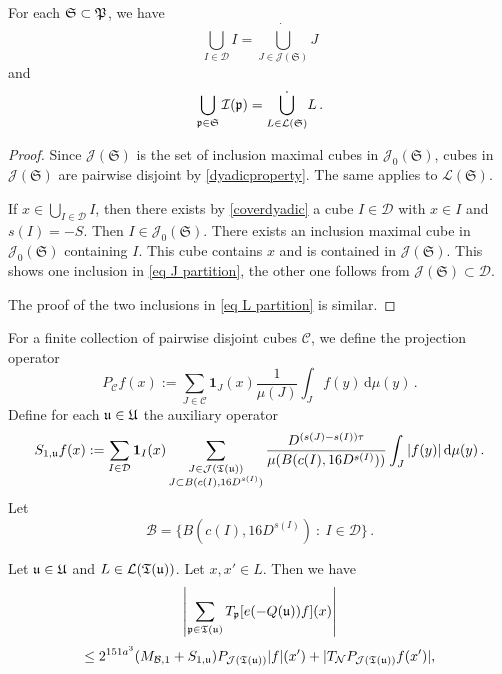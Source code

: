 \begin{lemma}
    \label{lem partition}
    For each $\mathfrak{S} \subset \mathfrak P$, we have
    \begin{equation}
        \label{eq J partition}
        \bigcup_{I \in \mathcal{D}} I = \dot{\bigcup_{J \in \mathcal{J}(\mathfrak{S})}} J
    \end{equation}
    and
    \begin{equation}
        \label{eq L partition}
        \bigcup_{\mathfrak p\in \mathfrak{S}} \mathcal{I}(\mathfrak p) = \dot{\bigcup_{L \in \mathcal{L}(\mathfrak{S})}} L\,.
    \end{equation}
\end{lemma}

\begin{proof}
    Since $\mathcal{J}(\mathfrak{S})$ is the set of inclusion maximal cubes in $\mathcal{J}_0(\mathfrak{S})$, cubes in $\mathcal{J}(\mathfrak{S})$ are pairwise disjoint by \eqref{dyadicproperty}. The same applies to $\mathcal{L}(\mathfrak{S})$.

    If $x \in \bigcup_{I \in \mathcal{D}} I$, then there exists by \eqref{coverdyadic} a cube $I \in \mathcal{D}$ with $x \in I$ and $s(I) = -S$. Then $I \in \mathcal{J}_0(\mathfrak{S})$. There exists an inclusion maximal cube in $\mathcal{J}_0(\mathfrak{S})$ containing $I$. This cube contains $x$ and is contained in $\mathcal{J}(\mathfrak{S})$. This shows one inclusion in \eqref{eq J partition}, the other one follows from $\mathcal{J}(\mathfrak{S}) \subset \mathcal{D}$.

    The proof of the two inclusions in \eqref{eq L partition} is similar.
\end{proof}

For a finite collection of pairwise disjoint cubes $\mathcal{C}$, we define the projection operator
$$
    P_{\mathcal{C}}f(x) :=\sum_{J\in\mathcal{C}}\mathbf{1}_J(x) \frac{1}{\mu(J)}\int_J f(y) \, \mathrm{d}\mu(y)\,.
$$
Define for each $\mathfrak u \in \mathfrak U$ the auxiliary operator
\begin{equation}
    \label{eq def S op}
    S_{1,\mathfrak u}f(x):=\sum_{I\in\mathcal{D}} \mathbf{1}_{I}(x) \sum_{\substack{J\in \mathcal{J}(\mathfrak T(\mathfrak u))\\
    J\subset B(c(I), 16 D^{s(I)})}} \frac{D^{(s(J) - s(I))\tau}}{\mu(B(c(I), 16D^{s(I)}))}\int_J |f(y)| \, \mathrm{d}\mu(y)\,.
\end{equation}
Let
$$
    \mathcal{B} = \{B(c(I), 16D^{s(I)}) \ : \ I \in \mathcal{D}\}\,.
$$

\begin{lemma}
    \label{lem pointw tree estimate}
    Let $\mathfrak u \in \mathfrak U$ and $L \in \mathcal{L}(\mathfrak T(\mathfrak u))$. Let $x, x' \in L$.
    Then we have 
    $$
        \left|\sum_{\mathfrak p \in \mathfrak T(\mathfrak u)} T_{\mathfrak p}[ e(-Q(\mathfrak u))f](x)\right|
    $$
    \begin{equation}
        \label{eq LJ ptwise}
        \leq 2^{151a^3}(M_{\mathcal{B},1}+S_{1,\mathfrak u})P_{\mathcal{J}(\mathfrak T(\mathfrak u))}|f|(x')+|T_{\mathcal{N}}P_{\mathcal{J}(\mathfrak T(\mathfrak u))}f(x')|,
    \end{equation}
\end{lemma}


